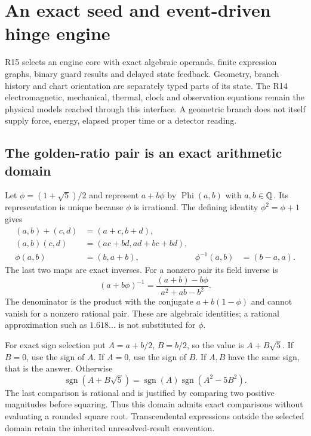 \section{An exact seed and event-driven hinge engine}
\label{sec:r15-hinge-core}
R15 selects an engine core with exact algebraic operands, finite expression
graphs, binary guard results and delayed state feedback. Geometry, branch
history and chart orientation are separately typed parts of its state. The
R14 electromagnetic, mechanical, thermal, clock and observation equations remain
the physical models reached through this interface. A geometric branch does
not itself supply force, energy, elapsed proper time or a detector reading.

\subsection{The golden-ratio pair is an exact arithmetic domain}
Let $\phi=(1+\sqrt5)/2$ and represent $a+b\phi$ by
$\operatorname{Phi}(a,b)$ with $a,b\in\mathbb{Q}$. Its representation is unique because
$\phi$ is irrational. The defining identity $\phi^2=\phi+1$ gives
\begin{align}
 (a,b)+(c,d)&=(a+c,b+d),\nonumber\\
 (a,b)(c,d)&=(ac+bd,ad+bc+bd),\nonumber\\
 \phi(a,b)&=(b,a+b),&
 \phi^{-1}(a,b)&=(b-a,a).
 \label{eq:r15-phi-pair}
\end{align}
The last two maps are exact inverses. For a nonzero pair its field inverse is
\begin{equation}
 (a+b\phi)^{-1}=\frac{(a+b)-b\phi}{a^2+ab-b^2}.
 \label{eq:r15-phi-inverse}
\end{equation}
The denominator is the product with the conjugate $a+b(1-\phi)$ and cannot
vanish for a nonzero rational pair. These are algebraic identities; a rational
approximation such as $1.618\ldots$ is not substituted for $\phi$.

For exact sign selection put $A=a+b/2$, $B=b/2$, so the value is
$A+B\sqrt5$. If $B=0$, use the sign of $A$. If $A=0$, use the sign of $B$.
If $A,B$ have the same sign, that is the answer. Otherwise
\begin{equation}
 \operatorname{sgn}(A+B\sqrt5)
 =\operatorname{sgn}(A)\operatorname{sgn}(A^2-5B^2).
 \label{eq:r15-phi-sign}
\end{equation}
The last comparison is rational and is justified by comparing two positive
magnitudes before squaring. Thus this domain admits exact comparisons without
evaluating a rounded square root. Transcendental expressions outside the
selected domain retain the inherited unresolved-result convention.

